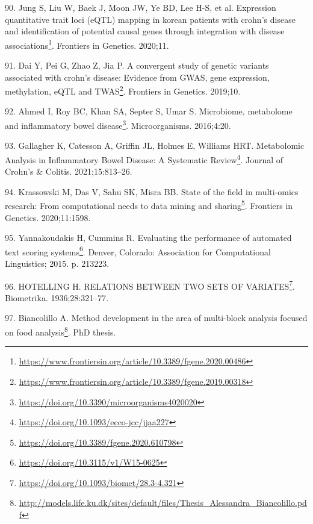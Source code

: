 \documentclass[
  12pt,
  a4paper,
  twoside,
  openright]{book}
\DeclareRobustCommand{\href}[2]{#2\footnote{\url{#1}}}
\newlength{\cslhangindent}
\newlength{\cslentryspacingunit} %
\newenvironment{CSLReferences}[2] %
 {%
  \setlength{\parindent}{0pt}
  \ifodd #1
  \let\oldpar\par
  \def\par{\hangindent=\cslhangindent\oldpar}
  \fi
  \setlength{\parskip}{#2\cslentryspacingunit}
 }%
 {}
\begin{document}
\begin{CSLReferences}{0}{0}
\leavevmode{}%
90. Jung S, Liu W, Baek J, Moon JW, Ye BD, Lee H-S, et al. \href{https://www.frontiersin.org/article/10.3389/fgene.2020.00486}{Expression quantitative trait loci (eQTL) mapping in korean patients with crohn{'}s disease and identification of potential causal genes through integration with disease associations}. Frontiers in Genetics. 2020;11.

\leavevmode{}%
91. Dai Y, Pei G, Zhao Z, Jia P. \href{https://www.frontiersin.org/article/10.3389/fgene.2019.00318}{A convergent study of genetic variants associated with crohn{'}s disease: Evidence from GWAS, gene expression, methylation, eQTL and TWAS}. Frontiers in Genetics. 2019;10.

\leavevmode{}%
92. Ahmed I, Roy BC, Khan SA, Septer S, Umar S. \href{https://doi.org/10.3390/microorganisms4020020}{Microbiome, metabolome and inflammatory bowel disease}. Microorganisms. 2016;4:20.

\leavevmode{}%
93. Gallagher K, Catesson A, Griffin JL, Holmes E, Williams HRT. \href{https://doi.org/10.1093/ecco-jcc/jjaa227}{Metabolomic Analysis in Inflammatory Bowel Disease: A Systematic Review}. Journal of Crohn's \& Colitis. 2021;15:813--26.

\leavevmode{}%
94. Krassowski M, Das V, Sahu SK, Misra BB. \href{https://doi.org/10.3389/fgene.2020.610798}{State of the field in multi-omics research: From computational needs to data mining and sharing}. Frontiers in Genetics. 2020;11:1598.

\leavevmode{}%
95. Yannakoudakis H, Cummins R. \href{https://doi.org/10.3115/v1/W15-0625}{Evaluating the performance of automated text scoring systems}. Denver, Colorado: Association for Computational Linguistics; 2015. p. 213223.

\leavevmode{}%
96. HOTELLING H. \href{https://doi.org/10.1093/biomet/28.3-4.321}{{RELATIONS BETWEEN TWO SETS OF VARIATES}}. Biometrika. 1936;28:321--77.

\leavevmode{}%
97. Biancolillo A. \href{http://models.life.ku.dk/sites/default/files/Thesis_Alessandra_Biancolillo.pdf}{Method development in the area of multi-block analysis focused on food analysis}. PhD thesis.


\end{CSLReferences}
\end{document}
